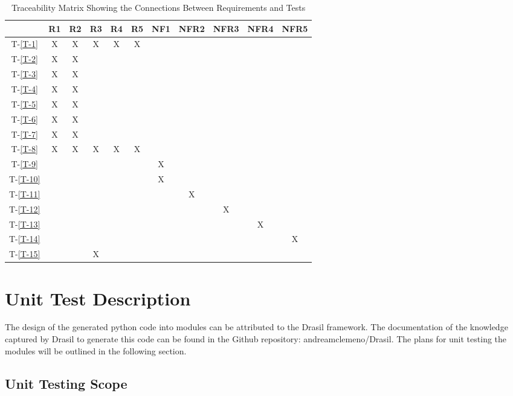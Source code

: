 \documentclass[12pt, titlepage]{article}
\newcommand{\tinref}[1]{T-\ref{#1}}
\begin{document}
\begin{table}[H]
\centering
\begin{tabular}{||c||c|c|c|c|c|c|c|c|c|c||}
\hline
	& R1 & R2 & R3 & R4 & R5 & NF1 & NFR2 & NFR3 & NFR4 & NFR5 \\
\hline
\tinref{T-1}        	& X& X& X& X& X& & & & & \\
\hline
\tinref{T-2}			& X& X& & & & & & & &\\
\hline
\tinref{T-3}        	& X& X& & & & & & & &\\
\hline
\tinref{T-4}			& X& X& & & & & & &  &\\
\hline
\tinref{T-5}        	& X& X& & & & & & & &\\
\hline
\tinref{T-6}			& X& X& & & & & & & &\\
\hline
\tinref{T-7}        	& X& X& & & & & & & &\\
\hline
\tinref{T-8}			& X& X&X & X& X& & & & &\\ 
\hline
\tinref{T-9}        	& & & & & &X & & & &\\
\hline
\tinref{T-10}			& & & & & &X & & & &\\
\hline
\tinref{T-11}        	& & & & & & &X & & &\\
\hline
\tinref{T-12}			& & & & & & & &X & &\\ 
\hline
\tinref{T-13}        	& & & & & & & & &X &\\
\hline
\tinref{T-14}			& & & & & & & & & &X\\
\hline
\tinref{T-15}        	& & &X & & & & & & &\\
\hline

\end{tabular}
\caption{Traceability Matrix Showing the Connections Between Requirements and 
Tests}
\label{Table:R_trace}
\end{table}


\section{Unit Test Description} \label{unittestcases}


The design of the generated python code into modules can be attributed to the 
Drasil framework. The documentation of the knowledge captured by Drasil to 
generate this code can be found in the Github repository: andreamclemeno/Drasil. 
The plans for unit testing the modules will be outlined in the following 
section.


\subsection{Unit Testing Scope}
\end{document}
